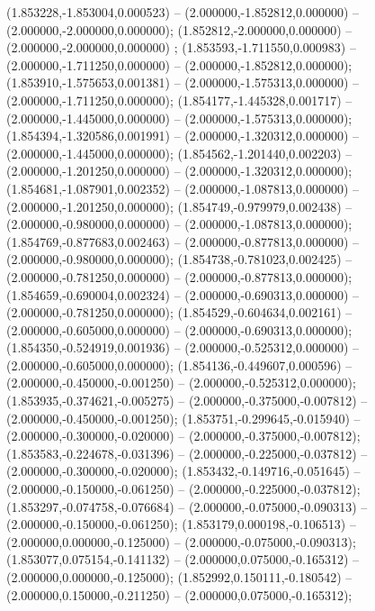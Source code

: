  (1.853228,-1.853004,0.000523) -- (2.000000,-1.852812,0.000000) -- (2.000000,-2.000000,0.000000);
 (1.852812,-2.000000,0.000000) -- (2.000000,-2.000000,0.000000) ;
 (1.853593,-1.711550,0.000983) -- (2.000000,-1.711250,0.000000) -- (2.000000,-1.852812,0.000000);
 (1.853910,-1.575653,0.001381) -- (2.000000,-1.575313,0.000000) -- (2.000000,-1.711250,0.000000);
 (1.854177,-1.445328,0.001717) -- (2.000000,-1.445000,0.000000) -- (2.000000,-1.575313,0.000000);
 (1.854394,-1.320586,0.001991) -- (2.000000,-1.320312,0.000000) -- (2.000000,-1.445000,0.000000);
 (1.854562,-1.201440,0.002203) -- (2.000000,-1.201250,0.000000) -- (2.000000,-1.320312,0.000000);
 (1.854681,-1.087901,0.002352) -- (2.000000,-1.087813,0.000000) -- (2.000000,-1.201250,0.000000);
 (1.854749,-0.979979,0.002438) -- (2.000000,-0.980000,0.000000) -- (2.000000,-1.087813,0.000000);
 (1.854769,-0.877683,0.002463) -- (2.000000,-0.877813,0.000000) -- (2.000000,-0.980000,0.000000);
 (1.854738,-0.781023,0.002425) -- (2.000000,-0.781250,0.000000) -- (2.000000,-0.877813,0.000000);
 (1.854659,-0.690004,0.002324) -- (2.000000,-0.690313,0.000000) -- (2.000000,-0.781250,0.000000);
 (1.854529,-0.604634,0.002161) -- (2.000000,-0.605000,0.000000) -- (2.000000,-0.690313,0.000000);
 (1.854350,-0.524919,0.001936) -- (2.000000,-0.525312,0.000000) -- (2.000000,-0.605000,0.000000);
 (1.854136,-0.449607,0.000596) -- (2.000000,-0.450000,-0.001250) -- (2.000000,-0.525312,0.000000);
 (1.853935,-0.374621,-0.005275) -- (2.000000,-0.375000,-0.007812) -- (2.000000,-0.450000,-0.001250);
 (1.853751,-0.299645,-0.015940) -- (2.000000,-0.300000,-0.020000) -- (2.000000,-0.375000,-0.007812);
 (1.853583,-0.224678,-0.031396) -- (2.000000,-0.225000,-0.037812) -- (2.000000,-0.300000,-0.020000);
 (1.853432,-0.149716,-0.051645) -- (2.000000,-0.150000,-0.061250) -- (2.000000,-0.225000,-0.037812);
 (1.853297,-0.074758,-0.076684) -- (2.000000,-0.075000,-0.090313) -- (2.000000,-0.150000,-0.061250);
 (1.853179,0.000198,-0.106513) -- (2.000000,0.000000,-0.125000) -- (2.000000,-0.075000,-0.090313);
 (1.853077,0.075154,-0.141132) -- (2.000000,0.075000,-0.165312) -- (2.000000,0.000000,-0.125000);
 (1.852992,0.150111,-0.180542) -- (2.000000,0.150000,-0.211250) -- (2.000000,0.075000,-0.165312);

